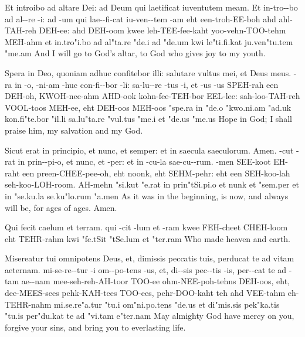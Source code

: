   {Et introibo ad altare Dei: ad Deum qui laetificat iuventutem meam.}
  {Et in-tro--bo ad al--re -i: ad -um qui lae--fi-cat iu-ven--tem -am}
  {eht een-troh-EE-boh ahd ahl-TAH-reh DEH-ee: ahd DEH-oom kwee leh-TEE-fee-kaht yoo-vehn-TOO-tehm MEH-ahm}
  {et in.tro"i.bo ad al"ta.re "de.i ad "de.um kwi le"ti.fi.kat ju.ven"tu.tem "me.am}
  {And I will go to God's altar, to God who gives joy to my youth.}

  {Spera in Deo, quoniam adhuc confitebor illi: salutare vultus mei, et Deus meus.}
  {-ra in -o, -ni-am -huc con-fi--bor -li: sa-lu--re -tus -i, et -us -us}
  {SPEH-rah een DEH-oh, KWOH-nee-ahm AHD-ook kohn-fee-TEH-bor EEL-lee: sah-loo-TAH-reh VOOL-toos MEH-ee, eht DEH-oos MEH-oos}
  {"spe.ra in "de.o "kwo.ni.am "ad.uk kon.fi"te.bor "il.li sa.lu"ta.re "vul.tus "me.i et "de.us "me.us}
  {Hope in God; I shall praise him, my salvation and my God.}

  {Sicut erat in principio, et nunc, et semper: et in saecula saeculorum. Amen.}
  {-cut -rat in prin--pi-o, et nunc, et -per: et in -cu-la sae-cu--rum. -men}
  {SEE-koot EH-raht een preen-CHEE-pee-oh, eht noonk, eht SEHM-pehr: eht een SEH-koo-lah seh-koo-LOH-room. AH-mehn}
  {"si.kut "e.rat in prin"tSi.pi.o et nunk et "sem.per et in "se.ku.la se.ku"lo.rum "a.men}
  {As it was in the beginning, is now, and always will be, for ages of ages. Amen.}

  {Qui fecit caelum et terram.}
  {qui -cit -lum et -ram}
  {kwee FEH-cheet CHEH-loom eht TEHR-rahm}
  {kwi "fe.tSit "tSe.lum et "ter.ram}
  {Who made heaven and earth.}

  {Misereatur tui omnipotens Deus, et, dimissis peccatis tuis, perducat te ad vitam aeternam.}
  {mi-se-re--tur -i om--po-tens -us, et, di--sis pec--tis -is, per--cat te ad -tam ae--nam}
  {mee-seh-reh-AH-toor TOO-ee ohm-NEE-poh-tehns DEH-oos, eht, dee-MEES-sees pehk-KAH-tees TOO-ees, pehr-DOO-kaht teh ahd VEE-tahm eh-TEHR-nahm}
  {mi.se.re"a.tur "tu.i om"ni.po.tens "de.us et di"mis.sis pek"ka.tis "tu.is per"du.kat te ad "vi.tam e"ter.nam}
  {May almighty God have mercy on you, forgive your sins, and bring you to everlasting life.}

